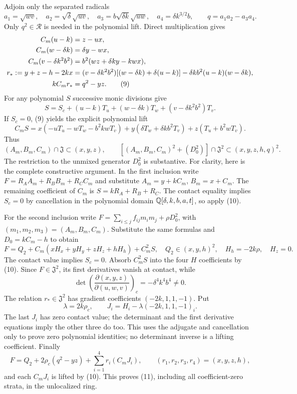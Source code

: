 Adjoin only the separated radicals
\[
 a_1=\sqrt{wv},\quad a_2=\sqrt\delta\sqrt{uv},\quad
 a_3=b\sqrt{\delta k}\sqrt{uw},\quad
 a_4=\delta k^{3/2}b,\qquad q=a_1a_2-a_3a_4.
\]
Only $q^2\in\mathcal R$ is needed in the polynomial lift. Direct
multiplication gives
\begin{align}
 C_m(u-k)&=z-ux,\notag\\
 C_m(w-\delta k)&=\delta y-wx,\notag\\
 C_m(v-\delta k^2b^2)&=b^2(wz+\delta ky-kwx),\notag\\
 r_*:=y+z-h-2kx
 &=(v-\delta k^2b^2)[(w-\delta k)+\delta(u-k)]
       -\delta kb^2(u-k)(w-\delta k),\notag\\
 kC_mr_*&=q^2-yz.                                      \tag{9}
\end{align}
For any polynomial $S$ successive monic divisions give
\[
 S=S_c+(u-k)T_u+(w-\delta k)T_w
              +(v-\delta k^2b^2)T_v.
\]
If $S_c=0$, (9) yields the explicit polynomial lift
\begin{equation}
 C_mS=x(-uT_u-wT_w-b^2kwT_v)
      +y(\delta T_w+\delta kb^2T_v)+z(T_u+b^2wT_v).      \tag{10}
\end{equation}
Thus
\begin{equation}
 (A_m,B_m,C_m)\cap\mathfrak J\subset(x,y,z),\qquad
 [(A_m,B_m,C_m)^2+(D_0^2)]\cap\mathfrak J^2
                      \subset(x,y,z,h,q)^2.            \tag{11}
\end{equation}
The restriction to the unmixed generator $D_0^2$ is substantive.
For clarity, here is the complete constructive argument. In the first
inclusion write $F=R_AA_m+R_BB_m+R_CC_m$ and substitute
$A_m=y+kC_m$, $B_m=x+C_m$. The remaining coefficient of $C_m$ is
$S=kR_A+R_B+R_C$. The contact equality implies $S_c=0$ by cancellation
in the polynomial domain $\mathbb Q[\delta,k,b,a,t]$, so apply (10).

For the second inclusion write
$F=\sum_{i\le j}f_{ij}m_im_j+\rho D_0^2$, with
$(m_1,m_2,m_3)=(A_m,B_m,C_m)$. Substitute the same formulas and
$D_0=kC_m-h$ to obtain
\[
 F=Q_2+C_m(xH_x+yH_y+zH_z+hH_h)+C_m^2S,
 \quad Q_2\in(x,y,h)^2,\quad H_h=-2k\rho,\quad H_z=0.
\]
The contact value implies $S_c=0$. Absorb $C_m^2S$ into the four
$H$ coefficients by (10). Since $F\in\mathfrak J^2$, its first
derivatives vanish at contact, while
\[
 \det\left(\frac{\partial(x,y,z)}{\partial(u,w,v)}\right)_c
        =-\delta^4k^4b^4\ne0.
\]
The relation $r_*\in\mathfrak J^2$ has gradient coefficients
$(-2k,1,1,-1)$. Put
\[
 \lambda=2k\rho_c,\qquad J_i=H_i-\lambda(-2k,1,1,-1)_i.
\]
The last $J_i$ has zero contact
value; the determinant and the first derivative equations imply the
other three do too. This uses the adjugate and cancellation only to
prove zero polynomial identities; no determinant inverse is a lifting
coefficient. Finally
\[
 F=Q_2+2\rho_c(q^2-yz)+\sum_{i=1}^4r_i(C_mJ_i),
 \qquad(r_1,r_2,r_3,r_4)=(x,y,z,h),
\]
and each $C_mJ_i$ is lifted by (10). This proves (11), including all
coefficient-zero strata, in the unlocalized ring.

